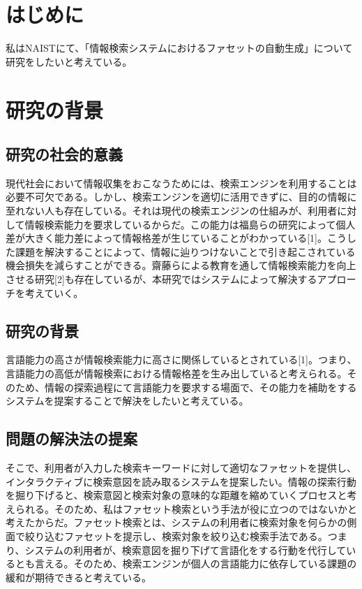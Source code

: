 \documentclass[a4j,12pt, twocolumn]{jarticle}
\begin{document}
\section{はじめに}
私はNAISTにて、「情報検索システムにおけるファセットの自動生成」について研究をしたいと考えている。
\section{研究の背景}
\subsection{研究の社会的意義}
現代社会において情報収集をおこなうためには、検索エンジンを利用することは必要不可欠である。しかし、検索エンジンを適切に活用できずに、目的の情報に至れない人も存在している。それは現代の検索エンジンの仕組みが、利用者に対して情報検索能力を要求しているからだ。この能力は福島らの研究によって個人差が大きく能力差によって情報格差が生じていることがわかっている[1]。こうした課題を解決することによって、情報に辿りつけないことで引き起こされている機会損失を減らすことができる。齋藤らによる教育を通して情報検索能力を向上させる研究[2]も存在しているが、本研究ではシステムによって解決するアプローチを考えていく。
\subsection{研究の背景}
言語能力の高さが情報検索能力に高さに関係しているとされている[1]。つまり、言語能力の高低が情報検索における情報格差を生み出していると考えられる。そのため、情報の探索過程にて言語能力を要求する場面で、その能力を補助をするシステムを提案することで解決をしたいと考えている。
\subsection{問題の解決法の提案}
そこで、利用者が入力した検索キーワードに対して適切なファセットを提供し、インタラクティブに検索意図を読み取るシステムを提案したい。情報の探索行動を掘り下げると、検索意図と検索対象の意味的な距離を縮めていくプロセスと考えられる。そのため、私はファセット検索という手法が役に立つのではないかと考えたからだ。ファセット検索とは、システムの利用者に検索対象を何らかの側面で絞り込むファセットを提示し、検索対象を絞り込む検索手法である。つまり、システムの利用者が、検索意図を掘り下げて言語化をする行動を代行しているとも言える。そのため、検索エンジンが個人の言語能力に依存している課題の緩和が期待できると考えている。
\end{document}
